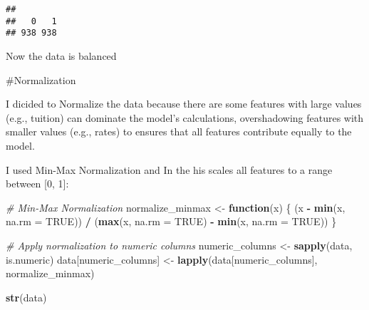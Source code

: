 \documentclass[
]{article}
\newenvironment{Shaded}{\begin{snugshade}}{\end{snugshade}}
\newcommand{\AttributeTok}[1]{\textcolor[rgb]{0.13,0.29,0.53}{#1}}
\newcommand{\CommentTok}[1]{\textcolor[rgb]{0.56,0.35,0.01}{\textit{#1}}}
\newcommand{\ConstantTok}[1]{\textcolor[rgb]{0.56,0.35,0.01}{#1}}
\newcommand{\ControlFlowTok}[1]{\textcolor[rgb]{0.13,0.29,0.53}{\textbf{#1}}}
\newcommand{\FunctionTok}[1]{\textcolor[rgb]{0.13,0.29,0.53}{\textbf{#1}}}
\newcommand{\NormalTok}[1]{#1}
\newcommand{\OtherTok}[1]{\textcolor[rgb]{0.56,0.35,0.01}{#1}}
\newcommand{\SpecialCharTok}[1]{\textcolor[rgb]{0.81,0.36,0.00}{\textbf{#1}}}
\begin{document}
\begin{verbatim}
## 
##   0   1 
## 938 938
\end{verbatim}

Now the data is balanced

\#Normalization

I dicided to Normalize the data because there are some features with
large values (e.g., tuition) can dominate the model's calculations,
overshadowing features with smaller values (e.g., rates) to ensures that
all features contribute equally to the model.

I used Min-Max Normalization and In the his scales all features to a
range between {[}0, 1{]}:

\begin{Shaded}
\begin{Highlighting}[]
\CommentTok{\# Min{-}Max Normalization}
\NormalTok{normalize\_minmax }\OtherTok{\textless{}{-}} \ControlFlowTok{function}\NormalTok{(x) \{}
\NormalTok{  (x }\SpecialCharTok{{-}} \FunctionTok{min}\NormalTok{(x, }\AttributeTok{na.rm =} \ConstantTok{TRUE}\NormalTok{)) }\SpecialCharTok{/}\NormalTok{ (}\FunctionTok{max}\NormalTok{(x, }\AttributeTok{na.rm =} \ConstantTok{TRUE}\NormalTok{) }\SpecialCharTok{{-}} \FunctionTok{min}\NormalTok{(x, }\AttributeTok{na.rm =} \ConstantTok{TRUE}\NormalTok{))}
\NormalTok{\}}

\CommentTok{\# Apply normalization to numeric columns}
\NormalTok{numeric\_columns }\OtherTok{\textless{}{-}} \FunctionTok{sapply}\NormalTok{(data, is.numeric)}
\NormalTok{data[numeric\_columns] }\OtherTok{\textless{}{-}} \FunctionTok{lapply}\NormalTok{(data[numeric\_columns], normalize\_minmax)}
\end{Highlighting}
\end{Shaded}

\begin{Shaded}
\begin{Highlighting}[]
\FunctionTok{str}\NormalTok{(data)}
\end{Highlighting}
\end{Shaded}
\end{document}
